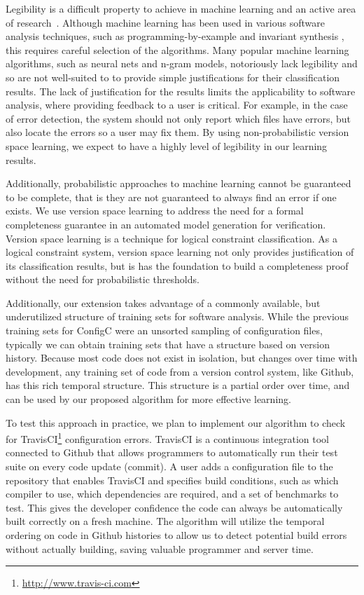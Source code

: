 Legibility is a difficult property to achieve in machine learning and an active area of research~\cite{lei2016rationalizing}.
Although machine learning has been used in various software analysis techniques, such as programming-by-example \cite{lau2000version} and invariant synthesis \cite{garg2014ice}, this requires careful selection of the algorithms.
Many popular machine learning algorithms, such as neural nets and n-gram models, notoriously lack legibility and so are not well-suited to to provide simple justifications for their classification results.
The lack of justification for the results limits the applicability to software analysis, where providing feedback to a user is critical.
For example, in the case of error detection, the system should not only report which files have errors, but also locate the errors so a user may fix them.
By using non-probabilistic version space learning, we expect to have a highly level of legibility in our learning results.

Additionally, probabilistic approaches to machine learning cannot be guaranteed to be complete, that is they are not guaranteed to always find an error if one exists.
We use version space learning to address the need for a formal completeness guarantee in an automated model generation for verification.
Version space learning is a technique for logical constraint classification.
As a logical constraint system, version space learning not only provides justification of its classification results, but is has the foundation to build a completeness proof without the need for probabilistic thresholds.

Additionally, our extension takes advantage of a commonly available, but underutilized structure of training sets for software analysis.
While the previous training sets for ConfigC were an unsorted sampling of configuration files, typically we can obtain training sets that have a structure based on version history.
Because most code does not exist in isolation, but changes over time with development, any training set of code from a version control system, like Github, has this rich temporal structure. 
This structure is a partial order over time, and can be used by our proposed algorithm for more effective learning.


To test this approach in practice, we plan to implement our algorithm to check for TravisCI\footnote{\url{http://www.travis-ci.com}} configuration errors.
TravisCI is a continuous integration tool connected to Github that allows programmers to automatically run their test suite on every code update (commit).
A user adds a configuration file to the repository that enables TravisCI and specifies build conditions, such as which compiler to use, which dependencies are required, and a set of benchmarks to test.
This gives the developer confidence the code can always be automatically built correctly on a fresh machine.
The algorithm will utilize the temporal ordering on code in Github histories to allow us to detect potential build errors without actually building, saving valuable programmer and server time.

